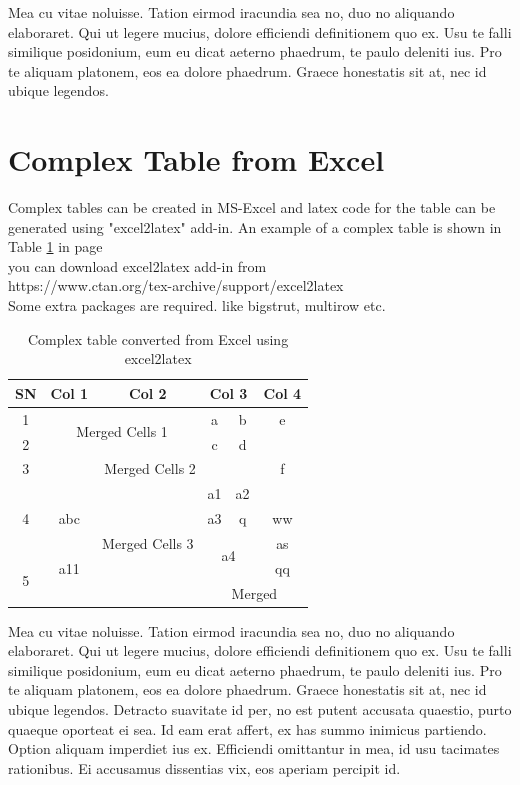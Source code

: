 Mea cu vitae noluisse. Tation eirmod iracundia sea no, duo no aliquando elaboraret. Qui ut legere mucius, dolore efficiendi definitionem quo ex. Usu te falli similique posidonium, eum eu dicat aeterno phaedrum, te paulo deleniti ius. Pro te aliquam platonem, eos ea dolore phaedrum. Graece honestatis sit at, nec id ubique legendos.

\section{Complex Table from Excel}
Complex tables can be created in MS-Excel and latex code for the table can be generated using "excel2latex" add-in.  An example of a complex table is shown in Table \ref{tab:complexTable} in page \pageref{tab:complexTable}\\ you can download excel2latex add-in from\\ 
https://www.ctan.org/tex-archive/support/excel2latex\\
Some extra packages are required. like bigstrut, multirow etc.
\begin{table}[htbp]
  \centering
  \caption{Complex table converted from Excel using excel2latex}
    \begin{tabular}{|c|c|c|c|c|c|}
    \hline
    SN    & Col 1 & Col 2 & \multicolumn{2}{c|}{Col 3} & Col 4 \bigstrut\\
    \hline
    1     & \multicolumn{2}{c|}{\multirow{2}[4]{*}{Merged Cells 1}} & a     & b     & e \bigstrut\\
\cline{1-1}\cline{4-6}    2     & \multicolumn{2}{c|}{} & c     & d     & \multirow{3}[6]{*}{f} \bigstrut\\
\cline{1-5}    3     & \multicolumn{4}{c|}{Merged Cells 2} &  \bigstrut\\
\cline{1-5}    \multirow{3}[6]{*}{4} & \multirow{3}[6]{*}{abc} & \multirow{5}[10]{*}{Merged Cells 3} & a1    & a2    &  \bigstrut\\
\cline{4-6}          &       &       & a3    & q     & ww \bigstrut\\
\cline{4-6}          &       &       & \multicolumn{2}{c|}{\multirow{2}[4]{*}{a4}} & as \bigstrut\\
\cline{1-2}\cline{6-6}    \multirow{2}[4]{*}{5} & a11   &       & \multicolumn{2}{c|}{} & qq \bigstrut\\
\cline{2-2}\cline{4-6}          &       &       & \multicolumn{3}{c|}{Merged} \bigstrut\\
    \hline
    \end{tabular}%
  \label{tab:complexTable}%
\end{table}%
Mea cu vitae noluisse. Tation eirmod iracundia sea no, duo no aliquando elaboraret. Qui ut legere mucius, dolore efficiendi definitionem quo ex. Usu te falli similique posidonium, eum eu dicat aeterno phaedrum, te paulo deleniti ius. Pro te aliquam platonem, eos ea dolore phaedrum. Graece honestatis sit at, nec id ubique legendos.
Detracto suavitate id per, no est putent accusata quaestio, purto quaeque oporteat ei sea. Id eam erat affert, ex has summo inimicus partiendo. Option aliquam imperdiet ius ex. Efficiendi omittantur in mea, id usu tacimates rationibus. Ei accusamus dissentias vix, eos aperiam percipit id.

